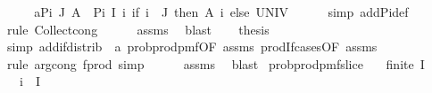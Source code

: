 \begin{isabellebody}
\ {\isacharminus}{\kern0pt}\isanewline
\ \ \isamarkupfalse%
\ a{\isacharcolon}{\kern0pt}{\isachardoublequoteopen}Pi\ J\ A\ {\isacharequal}{\kern0pt}\ Pi\ I\ {\isacharparenleft}{\kern0pt}{\isasymlambda}i{\isachardot}{\kern0pt}\ if\ i\ {\isasymin}\ J\ then\ A\ i\ else\ UNIV{\isacharparenright}{\kern0pt}{\isachardoublequoteclose}\isanewline
\ \ \ \ \isamarkupfalse%
\ {\isacharparenleft}{\kern0pt}simp\ add{\isacharcolon}{\kern0pt}Pi{\isacharunderscore}{\kern0pt}def{\isacharparenright}{\kern0pt}\isanewline
\ \ \ \ \isamarkupfalse%
\ {\isacharparenleft}{\kern0pt}rule\ Collect{\isacharunderscore}{\kern0pt}cong{\isacharparenright}{\kern0pt}\isanewline
\ \ \ \ \isamarkupfalse%
\ assms{\isacharparenleft}{\kern0pt}{}{\isacharparenright}{\kern0pt}\ \isamarkupfalse%
\ blast\isanewline
\ \ \isamarkupfalse%
\ {\isacharquery}{\kern0pt}thesis\isanewline
\ \ \ \ \isamarkupfalse%
\ {\isacharparenleft}{\kern0pt}simp\ add{\isacharcolon}{\kern0pt}if{\isacharunderscore}{\kern0pt}distrib\ \ a\ prob{\isacharunderscore}{\kern0pt}prod{\isacharunderscore}{\kern0pt}pmf{\isacharbrackleft}{\kern0pt}OF\ assms{\isacharparenleft}{\kern0pt}{}{\isacharparenright}{\kern0pt}{\isacharbrackright}{\kern0pt}\ prod{\isachardot}{\kern0pt}If{\isacharunderscore}{\kern0pt}cases{\isacharbrackleft}{\kern0pt}OF\ assms{\isacharparenleft}{\kern0pt}{}{\isacharparenright}{\kern0pt}{\isacharbrackright}{\kern0pt}{\isacharparenright}{\kern0pt}\isanewline
\ \ \ \ \isamarkupfalse%
\ {\isacharparenleft}{\kern0pt}rule\ arg{\isacharunderscore}{\kern0pt}cong{}{\isacharbrackleft}{\kern0pt}\ f{\isacharequal}{\kern0pt}{\isachardoublequoteopen}prod{\isachardoublequoteclose}{\isacharbrackright}{\kern0pt}{\isacharcomma}{\kern0pt}\ simp{\isacharparenright}{\kern0pt}\isanewline
\ \ \ \ \isamarkupfalse%
\ assms{\isacharparenleft}{\kern0pt}{}{\isacharparenright}{\kern0pt}\ \isamarkupfalse%
\ blast\isanewline
{}\isamarkupfalse%
%
\endisatagproof
{\isafoldproof}%
%
\isadelimproof
\isanewline
%
\endisadelimproof
\isanewline
{}\isamarkupfalse%
\ prob{\isacharunderscore}{\kern0pt}prod{\isacharunderscore}{\kern0pt}pmf{\isacharunderscore}{\kern0pt}slice{\isacharcolon}{\kern0pt}\isanewline
\ \ \ {\isachardoublequoteopen}finite\ I{\isachardoublequoteclose}\isanewline
\ \ \ {\isachardoublequoteopen}i\ {\isasymin}\ I{\isachardoublequoteclose}\isanewline

\end{isabellebody}
